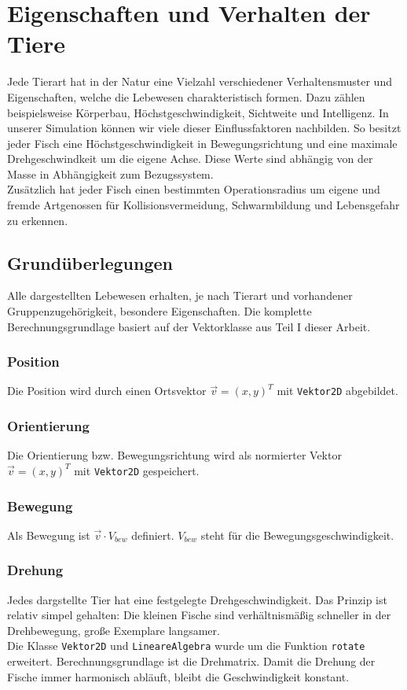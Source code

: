 \documentclass[11pt]{article}
\begin{document}
\section{Eigenschaften und Verhalten der Tiere}
Jede Tierart hat in der Natur eine Vielzahl verschiedener Verhaltensmuster und Eigenschaften, welche die Lebewesen charakteristisch formen. Dazu zählen beispielsweise Körperbau, Höchstgeschwindigkeit, Sichtweite und Intelligenz. In unserer Simulation können wir viele dieser Einflussfaktoren nachbilden.
So besitzt jeder Fisch eine Höchstgeschwindigkeit in Bewegungsrichtung und eine maximale Drehgeschwindkeit um die eigene Achse. Diese Werte sind abhängig von der Masse in Abhängigkeit zum Bezugssystem.\\
Zusätzlich hat jeder Fisch einen bestimmten Operationsradius um eigene und fremde Artgenossen für Kollisionsvermeidung, Schwarmbildung und Lebensgefahr zu erkennen.
\newpage
\subsection{Grundüberlegungen}
Alle dargestellten Lebewesen erhalten, je nach Tierart und vorhandener Gruppenzugehörigkeit, besondere Eigenschaften. Die komplette Berechnungsgrundlage basiert auf der Vektorklasse aus Teil I dieser Arbeit.
\subsubsection{Position}
Die Position wird durch einen Ortsvektor \( \vec{v}=(x,y)^T \) mit \lstinline{Vektor2D} abgebildet.
\subsubsection{Orientierung}
Die Orientierung bzw. Bewegungsrichtung wird als normierter Vektor \( \vec{v}=(x,y)^T \) mit \lstinline{Vektor2D} gespeichert.
\subsubsection{Bewegung}
Als Bewegung ist \( \vec{v} \cdot V_{bew} \) definiert. \( V_{bew} \) steht für die Bewegungsgeschwindigkeit.
\subsubsection{Drehung}
Jedes dargstellte Tier hat eine festgelegte Drehgeschwindigkeit. Das Prinzip ist relativ simpel gehalten: Die kleinen Fische sind verhältnismäßig schneller in der Drehbewegung, große Exemplare langsamer.\\
Die Klasse \lstinline{Vektor2D} und \lstinline{LineareAlgebra} wurde um die Funktion \lstinline{rotate} erweitert. Berechnungsgrundlage ist die Drehmatrix. Damit die Drehung der Fische immer harmonisch abläuft, bleibt die Geschwindigkeit konstant.
\end{document}
